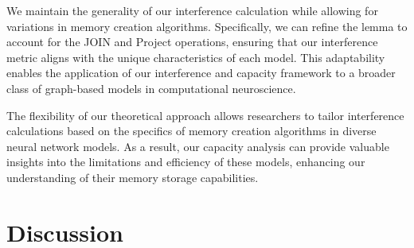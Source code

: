 We maintain the generality of our interference calculation while allowing for variations in memory creation algorithms. Specifically, we can refine the lemma to account for the JOIN and Project operations, ensuring that our interference metric aligns with the unique characteristics of each model. This adaptability enables the application of our interference and capacity framework to a broader class of graph-based models in computational neuroscience.

The flexibility of our theoretical approach allows researchers to tailor interference calculations based on the specifics of memory creation algorithms in diverse neural network models. As a result, our capacity analysis can provide valuable insights into the limitations and efficiency of these models, enhancing our understanding of their memory storage capabilities.







\section{Discussion}














